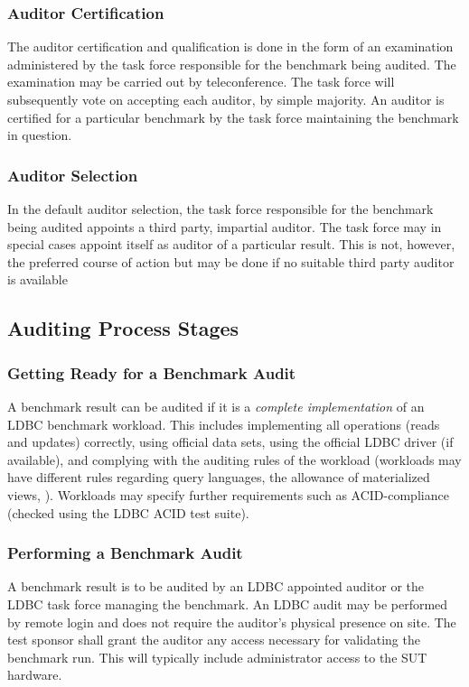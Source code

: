 \subsubsection{Auditor Certification}
The auditor certification and qualification is done in the form of an examination administered by the task force responsible for the benchmark being audited. The examination may be carried out by teleconference. The task force will subsequently vote on accepting each auditor, by simple majority. An auditor is certified for a particular benchmark by the task force maintaining the benchmark in question.

\subsubsection{Auditor Selection}
In the default auditor selection, the task force responsible for the benchmark being audited appoints a third party, impartial auditor. The task force may in special cases appoint itself as auditor of a particular result. This is not, however, the preferred course of action but may be done if no suitable third party auditor is available


\subsection{Auditing Process Stages}
\subsubsection{Getting Ready for a Benchmark Audit}
A benchmark result can be audited if it is a \emph{complete implementation} of an LDBC benchmark workload. This includes implementing all operations (reads and updates) correctly, using official data sets, using the official LDBC driver (if available), and complying with the auditing rules of the workload (\eg workloads may have different rules regarding query languages, the allowance of materialized views, \etc).
Workloads may specify further requirements such as ACID-compliance (checked using the LDBC ACID test suite).

\subsubsection{Performing a Benchmark Audit}
A benchmark result is to be audited by an LDBC appointed auditor or the LDBC task force managing the benchmark. An LDBC audit may be performed by remote login and does not require the auditor's physical presence on site. The test sponsor shall grant the auditor any access necessary for validating the benchmark run. This will typically include administrator access to the SUT hardware.

